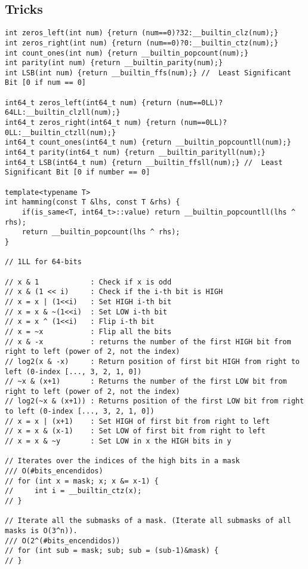 \documentclass[10pt,letterpaper,twocolumn,twosided]{article}
\begin{document}
\subsection{Tricks}
\begin{lstlisting}
int zeros_left(int num) {return (num==0)?32:__builtin_clz(num);}
int zeros_right(int num) {return (num==0)?0:__builtin_ctz(num);}
int count_ones(int num) {return __builtin_popcount(num);}
int parity(int num) {return __builtin_parity(num);}
int LSB(int num) {return __builtin_ffs(num);} //  Least Significant Bit [0 if num == 0]
 
int64_t zeros_left(int64_t num) {return (num==0LL)?64LL:__builtin_clzll(num);}
int64_t zeros_right(int64_t num) {return (num==0LL)?0LL:__builtin_ctzll(num);}
int64_t count_ones(int64_t num) {return __builtin_popcountll(num);}
int64_t parity(int64_t num) {return __builtin_parityll(num);}
int64_t LSB(int64_t num) {return __builtin_ffsll(num);} //  Least Significant Bit [0 if number == 0]
 
template<typename T>
int hamming(const T &lhs, const T &rhs) {
    if(is_same<T, int64_t>::value) return __builtin_popcountll(lhs ^ rhs);
    return __builtin_popcount(lhs ^ rhs);
}

// 1LL for 64-bits

// x & 1            : Check if x is odd
// x & (1 << i)     : Check if the i-th bit is HIGH
// x = x | (1<<i)   : Set HIGH i-th bit
// x = x & ~(1<<i)  : Set LOW i-th bit
// x = x ^ (1<<i)   : Flip i-th bit
// x = ~x           : Flip all the bits
// x & -x           : returns the number of the first HIGH bit from right to left (power of 2, not the index)
// log2(x & -x)     : Return position of first bit HIGH from right to left (0-index [..., 3, 2, 1, 0])
// ~x & (x+1)       : Returns the number of the first LOW bit from right to left (power of 2, not the index)
// log2(~x & (x+1)) : Returns position of the first LOW bit from right to left (0-index [..., 3, 2, 1, 0])
// x = x | (x+1)    : Set HIGH of first bit from right to left
// x = x & (x-1)    : Set LOW of first bit from right to left
// x = x & ~y       : Set LOW in x the HIGH bits in y

// Iterates over the indices of the high bits in a mask
/// O(#bits_encendidos)
// for (int x = mask; x; x &= x-1) {
//     int i = __builtin_ctz(x);
// }

// Iterate all the submasks of a mask. (Iterate all submasks of all masks is O(3^n)).
/// O(2^(#bits_encendidos))
// for (int sub = mask; sub; sub = (sub-1)&mask) {
// }
\end{lstlisting}
\end{document}
